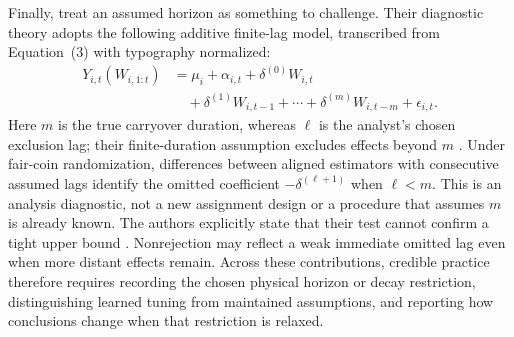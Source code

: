 Finally, \citet{carryover2025} treat an assumed horizon as something to challenge. Their diagnostic theory adopts the following additive finite-lag model, transcribed from Equation~(3) with typography normalized:
\begin{equation}\label{eq:carryover-diagnostic-model}
\begin{aligned}
Y_{i,t}(W_{i,1:t})
 &=\mu_i+\alpha_{i,t}+\delta^{(0)}W_{i,t}\\
 &\quad+\delta^{(1)}W_{i,t-1}+\cdots+\delta^{(m)}W_{i,t-m}+\epsilon_{i,t}.
\end{aligned}
\end{equation}
Here $m$ is the true carryover duration, whereas $\ell$ is the analyst's chosen exclusion lag; their finite-duration assumption excludes effects beyond $m$ \citep[Assumption~2, p.~2; Eq.~(3), p.~3]{carryover2025}. Under fair-coin randomization, differences between aligned estimators with consecutive assumed lags identify the omitted coefficient $-\delta^{(\ell+1)}$ when $\ell<m$. This is an analysis diagnostic, not a new assignment design or a procedure that assumes $m$ is already known. The authors explicitly state that their test cannot confirm a tight upper bound \citep[Section~3.1, p.~3]{carryover2025}. Nonrejection may reflect a weak immediate omitted lag even when more distant effects remain. Across these contributions, credible practice therefore requires recording the chosen physical horizon or decay restriction, distinguishing learned tuning from maintained assumptions, and reporting how conclusions change when that restriction is relaxed.
